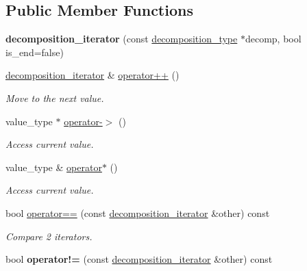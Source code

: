 \subsection*{Public Member Functions}
\begin{DoxyCompactItemize}
\item 
\mbox{\label{classdice_1_1decomposition__iterator_afb218e94fad101615d43e92eb7ca9e30}} 
{\bfseries decomposition\+\_\+iterator} (const \mbox{\hyperlink{classdice_1_1decomposition}{decomposition\+\_\+type}} $\ast$decomp, bool is\+\_\+end=false)
\item 
\mbox{\hyperlink{classdice_1_1decomposition__iterator}{decomposition\+\_\+iterator}} \& \mbox{\hyperlink{classdice_1_1decomposition__iterator_afdd9eb500d48653f709548f7ae34bf2f}{operator++}} ()
\begin{DoxyCompactList}\small\item\em Move to the next value. \end{DoxyCompactList}\item 
value\+\_\+type $\ast$ \mbox{\hyperlink{classdice_1_1decomposition__iterator_aee9da45888a6249ebada6f9507770bdf}{operator-\/$>$}} ()
\begin{DoxyCompactList}\small\item\em Access current value. \end{DoxyCompactList}\item 
value\+\_\+type \& \mbox{\hyperlink{classdice_1_1decomposition__iterator_a77865c81e7e643f634c41a0cb0ae55fb}{operator$\ast$}} ()
\begin{DoxyCompactList}\small\item\em Access current value. \end{DoxyCompactList}\item 
bool \mbox{\hyperlink{classdice_1_1decomposition__iterator_a3a62c8222ebb9b10ea5914e4f58e81f1}{operator==}} (const \mbox{\hyperlink{classdice_1_1decomposition__iterator}{decomposition\+\_\+iterator}} \&other) const
\begin{DoxyCompactList}\small\item\em Compare 2 iterators. \end{DoxyCompactList}\item 
\mbox{\label{classdice_1_1decomposition__iterator_a0a75500b466ff8da21569c178d6392ff}} 
bool {\bfseries operator!=} (const \mbox{\hyperlink{classdice_1_1decomposition__iterator}{decomposition\+\_\+iterator}} \&other) const
\end{DoxyCompactItemize}


